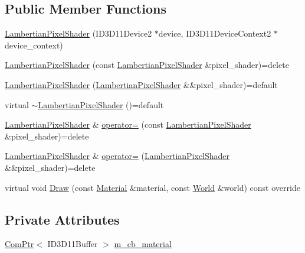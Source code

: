 \subsection*{Public Member Functions}
\begin{DoxyCompactItemize}
\item 
\hyperlink{classmage_1_1_lambertian_pixel_shader_a5f16778caf62403d148bf5edee042935}{Lambertian\+Pixel\+Shader} (I\+D3\+D11\+Device2 $\ast$device, I\+D3\+D11\+Device\+Context2 $\ast$device\+\_\+context)
\item 
\hyperlink{classmage_1_1_lambertian_pixel_shader_a0e7a36645bb7e1fa9bd481575886ddad}{Lambertian\+Pixel\+Shader} (const \hyperlink{classmage_1_1_lambertian_pixel_shader}{Lambertian\+Pixel\+Shader} \&pixel\+\_\+shader)=delete
\item 
\hyperlink{classmage_1_1_lambertian_pixel_shader_aadcfc17f23e4a2604703c153d8b411b8}{Lambertian\+Pixel\+Shader} (\hyperlink{classmage_1_1_lambertian_pixel_shader}{Lambertian\+Pixel\+Shader} \&\&pixel\+\_\+shader)=default
\item 
virtual \hyperlink{classmage_1_1_lambertian_pixel_shader_aedea7342ae95c6532a086fb28978b5b0}{$\sim$\+Lambertian\+Pixel\+Shader} ()=default
\item 
\hyperlink{classmage_1_1_lambertian_pixel_shader}{Lambertian\+Pixel\+Shader} \& \hyperlink{classmage_1_1_lambertian_pixel_shader_a03ae64ef13e62b33c6b6ac306207a045}{operator=} (const \hyperlink{classmage_1_1_lambertian_pixel_shader}{Lambertian\+Pixel\+Shader} \&pixel\+\_\+shader)=delete
\item 
\hyperlink{classmage_1_1_lambertian_pixel_shader}{Lambertian\+Pixel\+Shader} \& \hyperlink{classmage_1_1_lambertian_pixel_shader_af3fd77b32ff54a932b9c8734446cd5bd}{operator=} (\hyperlink{classmage_1_1_lambertian_pixel_shader}{Lambertian\+Pixel\+Shader} \&\&pixel\+\_\+shader)=delete
\item 
virtual void \hyperlink{classmage_1_1_lambertian_pixel_shader_a7394a51578de77cd7e57b9bd63895ffd}{Draw} (const \hyperlink{structmage_1_1_material}{Material} \&material, const \hyperlink{classmage_1_1_world}{World} \&world) const override
\end{DoxyCompactItemize}
\subsection*{Private Attributes}
\begin{DoxyCompactItemize}
\item 
\hyperlink{namespacemage_ae74f374780900893caa5555d1031fd79}{Com\+Ptr}$<$ I\+D3\+D11\+Buffer $>$ \hyperlink{classmage_1_1_lambertian_pixel_shader_aff89982b5f85531515ec2316930b2944}{m\+\_\+cb\+\_\+material}
\end{DoxyCompactItemize}
